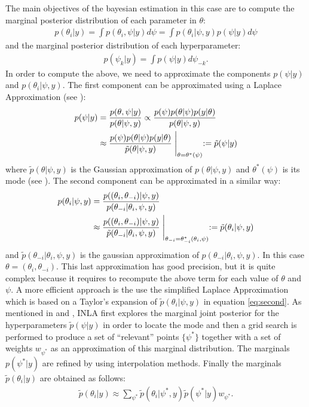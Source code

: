 \documentclass[11pt]{amsart}
\theoremstyle{plain}
\theoremstyle{definition}
\theoremstyle{remark}
\begin{document}
The main objectives of the bayesian estimation in this case are to compute the
marginal posterior distribution of each parameter in $\theta$:
\begin{align*}
  p(\theta_i|y) = \int p(\theta_i,\psi|y)d \psi = \int p(\theta_i|\psi,y)p(\psi|y)d \psi
\end{align*}
and the marginal posterior distribution of each hyperparameter:
\begin{align*}
  p(\psi_k|y)=\int p(\psi|y) d\psi_{-k}.
\end{align*}
In order to compute the above, we need to approximate the components $p(\psi|y)$
and $p(\theta_i|\psi,y)$. The first component can be approximated using a
Laplace Approximation (see \cite{Tierney1986}):
\begin{align*}
  p(\psi|y)&=\frac{p(\theta,\psi|y)}{p(\theta|\psi,y)}\propto \frac{p(\psi)p(\theta|\psi)p(y|\theta)}{p(\theta|\psi,y)}\\
           & \approx  \frac{p(\psi)p(\theta|\psi)p(y|\theta)}{\tilde p(\theta|\psi,y)} \Biggm |_{\theta=\theta^*(\psi)} := \tilde p(\psi|y)
\end{align*}
where $\tilde p(\theta|\psi,y)$ is the Gaussian approximation of
$p(\theta|\psi,y)$ and $\theta^*(\psi)$ is its mode (see \cite{Rue2009}). The
second component can be approximated in a similar way:
\begin{align}\label{eq:second}
  p(\theta_i|\psi,y)&=\frac{p((\theta_i,\theta_{-i})|\psi,y)}{p(\theta_{-i}|\theta_i,\psi,y)} \notag \\
  &\approx \frac{p((\theta_i,\theta_{-i})|\psi,y)}{\tilde p(\theta_{-i}|\theta_i,\psi,y)} \Biggm |_{\theta_{-i}=\theta_{-i}^*(\theta_i,\psi)}:=\tilde p(\theta_i|\psi,y)
\end{align}
and $\tilde p(\theta_{-i}|\theta_i,\psi,y)$ is the gaussian approximation of
$p(\theta_{-i}|\theta_i,\psi,y)$. In this case $\theta=(\theta_i,\theta_{-i})$.
This last approximation has good precision, but it is quite complex because it
requires to recompute the above term for each value of $\theta$ and $\psi$. A
more efficient approach is the use the simplified Laplace Approximation which is
based on a Taylor's expansion of $\tilde p(\theta_i|\psi,y)$ in equation
\eqref{eq:second}. As mentioned in \cite{Rue2009} and \cite{Blangiardo2013},
INLA first explores the marginal joint posterior for the hyperparameters $\tilde
p(\psi | y)$ in order to locate the mode and then a grid search is performed to
produce a set of ``relevant'' points $\{\psi^*\}$ together with a set of weights
$w_{\psi^*}$ as an approximation of this marginal distribution. The marginals
$p(\psi^*|y)$ are refined by using interpolation methods. Finally the marginals
$\tilde p(\theta_i|y)$ are obtained as follows:
\begin{align*}
  \tilde p(\theta_i|y) \approx \sum_{\psi^*}\tilde p(\theta_i|\psi^*,y)\tilde p(\psi^*|y)w_{\psi^*}.
\end{align*}
\end{document}
